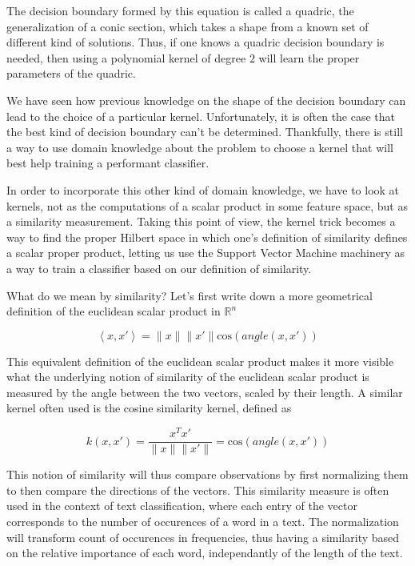 The decision boundary formed by this equation is called a quadric, the generalization of a conic section, which takes a shape from a known set of different kind of solutions. Thus, if one knows a quadric decision boundary is needed, then using a polynomial kernel of degree $2$ will learn the proper parameters of the quadric.

We have seen how previous knowledge on the shape of the decision boundary can lead to the choice of a particular kernel. Unfortunately, it is often the case that the best kind of decision boundary can't be determined. Thankfully, there is still a way to use domain knowledge about the problem to choose a kernel that will best help training a performant classifier.


In order to incorporate this other kind of domain knowledge, we have to look at kernels, not as the computations of a scalar product in some feature space, but as a similarity measurement. Taking this point of view, the kernel trick becomes a way to find the proper Hilbert space in which one's definition of similarity defines a scalar proper product, letting us use the Support Vector Machine machinery as a way to train a classifier based on our definition of similarity.

What do we mean by similarity? Let's first write down a more geometrical  definition of the euclidean scalar product in $\mathbb{R}^n$ 

\begin{equation*}
  \left<x, x'\right> = \|x\|\|x'\|\text{cos}\left(angle\left(x, x'\right)
  \right)
\end{equation*}

This equivalent definition of the euclidean scalar product makes it more visible what the underlying notion of similarity of the euclidean scalar product is measured by the angle between the two vectors, scaled by their length. A similar kernel often used is the cosine similarity kernel, defined as

\begin{equation*}
  k\left(x, x'\right) = \frac{x^Tx'}{\|x\|\|x'\|} = \text{cos}\left(angle\left(x, x'\right)\right)
\end{equation*}

This notion of similarity will thus compare observations by first normalizing them to then compare the directions of the vectors. This similarity measure is often used in the context of text classification, where each entry of the vector corresponds to the number of occurences of a word in a text. The normalization will transform count of occurences in frequencies, thus having a similarity based on the relative importance of each word, independantly of the length of the text.

